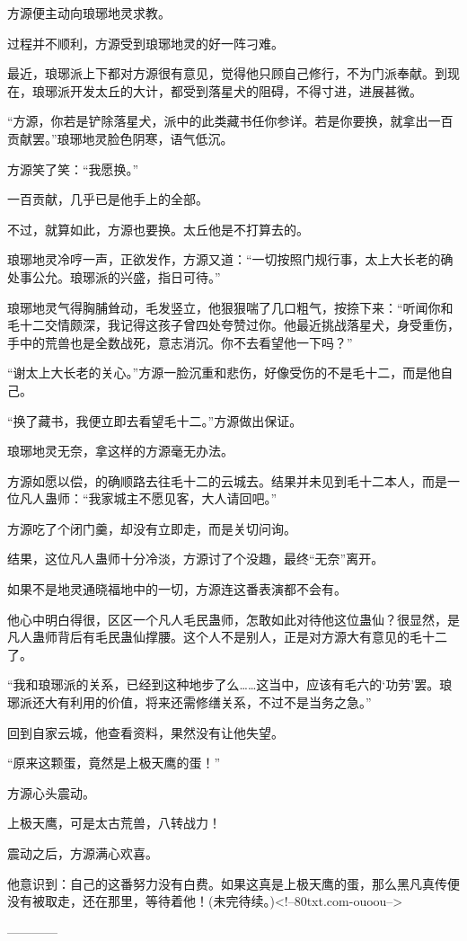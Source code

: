 \begin{this_body}
方源便主动向琅琊地灵求教。

过程并不顺利，方源受到琅琊地灵的好一阵刁难。

最近，琅琊派上下都对方源很有意见，觉得他只顾自己修行，不为门派奉献。到现在，琅琊派开发太丘的大计，都受到落星犬的阻碍，不得寸进，进展甚微。

“方源，你若是铲除落星犬，派中的此类藏书任你参详。若是你要换，就拿出一百贡献罢。”琅琊地灵脸色阴寒，语气低沉。

方源笑了笑：“我愿换。”

一百贡献，几乎已是他手上的全部。

不过，就算如此，方源也要换。太丘他是不打算去的。

琅琊地灵冷哼一声，正欲发作，方源又道：“一切按照门规行事，太上大长老的确处事公允。琅琊派的兴盛，指日可待。”

琅琊地灵气得胸脯耸动，毛发竖立，他狠狠喘了几口粗气，按捺下来：“听闻你和毛十二交情颇深，我记得这孩子曾四处夸赞过你。他最近挑战落星犬，身受重伤，手中的荒兽也是全数战死，意志消沉。你不去看望他一下吗？”

“谢太上大长老的关心。”方源一脸沉重和悲伤，好像受伤的不是毛十二，而是他自己。

“换了藏书，我便立即去看望毛十二。”方源做出保证。

琅琊地灵无奈，拿这样的方源毫无办法。

方源如愿以偿，的确顺路去往毛十二的云城去。结果并未见到毛十二本人，而是一位凡人蛊师：“我家城主不愿见客，大人请回吧。”

方源吃了个闭门羹，却没有立即走，而是关切问询。

结果，这位凡人蛊师十分冷淡，方源讨了个没趣，最终“无奈”离开。

如果不是地灵通晓福地中的一切，方源连这番表演都不会有。

他心中明白得很，区区一个凡人毛民蛊师，怎敢如此对待他这位蛊仙？很显然，是凡人蛊师背后有毛民蛊仙撑腰。这个人不是别人，正是对方源大有意见的毛十二了。

“我和琅琊派的关系，已经到这种地步了么……这当中，应该有毛六的‘功劳’罢。琅琊派还大有利用的价值，将来还需修缮关系，不过不是当务之急。”

回到自家云城，他查看资料，果然没有让他失望。

“原来这颗蛋，竟然是上极天鹰的蛋！”

方源心头震动。

上极天鹰，可是太古荒兽，八转战力！

震动之后，方源满心欢喜。

他意识到：自己的这番努力没有白费。如果这真是上极天鹰的蛋，那么黑凡真传便没有被取走，还在那里，等待着他！(未完待续。)<!--80txt.com-ouoou-->

------------

\end{this_body}

